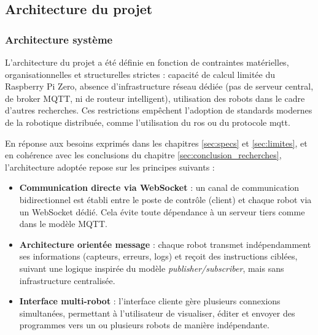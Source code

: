 \subsection{Architecture du projet} \label{sec:architecture}

\subsubsection{Architecture système} \label{sec:architecture_système}
L'architecture du projet a été définie en fonction de contraintes matérielles, organisationnelles et structurelles strictes : capacité de calcul limitée du Raspberry Pi Zero, absence d'infrastructure réseau dédiée (pas de serveur central, de broker MQTT, ni de routeur intelligent), utilisation des robots dans le cadre d'autres recherches.  
Ces restrictions empêchent l’adoption de standards modernes de la robotique distribuée, comme l’utilisation du \acrfull{ros} ou du protocole \acrfull{mqtt}.

En réponse aux besoins exprimés dans les chapitres \ref{sec:specs} et \ref{sec:limites}, et en cohérence avec les conclusions du chapitre \ref{sec:conclusion_recherches}, l’architecture adoptée repose sur les principes suivants :

\begin{itemize}
    \item \textbf{Communication directe via WebSocket} : un canal de communication bidirectionnel est établi entre le poste de contrôle (client) et chaque robot via un WebSocket dédié. 
    Cela évite toute dépendance à un serveur tiers comme dans le modèle MQTT.
    
    \item \textbf{Architecture orientée message} : chaque robot transmet indépendamment ses informations (capteurs, erreurs, logs) et reçoit des instructions ciblées, suivant une logique inspirée du modèle \textit{publisher/subscriber}, mais sans infrastructure centralisée.
    
    \item \textbf{Interface multi-robot} : l’interface cliente gère plusieurs connexions simultanées, permettant à l’utilisateur de visualiser, éditer et envoyer des programmes vers un ou plusieurs robots de manière indépendante.
\end{itemize}

